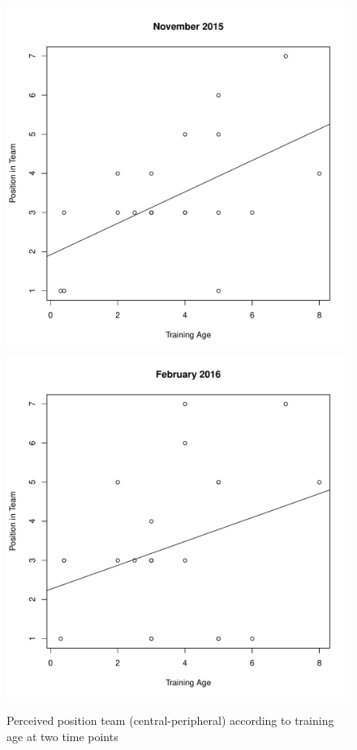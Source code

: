 \begin{CJK}{UTF8}{gbsn}
\begin{figure}[htbp]
  \centering
\includegraphics[scale=.3]{images/teamPosTrainingNov.pdf}
\includegraphics[scale=.3]{images/teamPosTrainingFeb.pdf}
  \caption{Perceived position team (central-peripheral) according to training age at two time points}
  \label{fig:teamPositionTrainingAge}
\end{figure}


\end{CJK}
